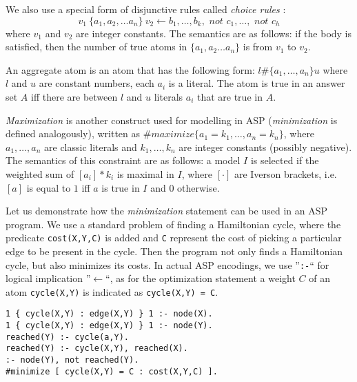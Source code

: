 We also use a special form of disjunctive rules called \textit{choice rules} \parencite{ASPbook}:
\begin{equation*}
  v_1~\{ a_1, a_2, \dots a_n \}~v_2 \leftarrow b_1, \dots, b_k, \textit{ not }c_1,\dots,\textit{ not }c_h
\end{equation*}
where $v_1$ and $v_2$ are integer constants. The semantics are as follows: if the body is satisfied, then the number of true atoms in $\{ a_1, a_2 \dots a_n \}$ is from $v_1$ to $v_2$.

An aggregate atom is an atom that has the following form: $l \# \{ a_1, \dots ,a_n \} u$
where $l$ and $u$ are constant numbers, each $a_i$ is a literal. \pubrev The atom is true in an answer set $A$ iff there are between $l$ and $u$ literals $a_i$ that are true in $A$. 

\textit{Maximization} is another construct used for modelling in ASP \parencite{ASPbook, leone} (\textit{minimization} is defined analogously), written as $\#\textit{maximize}\{ a_1=k_1, \dots, a_n=k_n \}$, 
where $a_1, \dots, a_n$ are classic literals and $k_1, \dots, k_n$ are integer constants (possibly negative). The semantics of this constraint are as follows: a model $I$ is selected if the weighted sum of $[a_i]*k_i$ is maximal in $I$, where $[\cdot]$ are Iverson brackets, i.e. $[a]$ is equal to $1$ iff $a$ is true in $I$ and $0$ otherwise. \pubrevend

\begin{example}
    \pubrev
    Let us demonstrate how the \textit{minimization} statement can be used in an ASP program. We use a standard problem of finding a Hamiltonian cycle, where the predicate \texttt{cost(X,Y,C)} is added and \texttt{C} represent the cost of picking a particular edge to be present in the cycle. Then the program not only finds a Hamiltonian cycle, but also minimizes its costs. In actual ASP encodings, we use ''\texttt{:-}`` for logical implication ''$\leftarrow$``, as for the optimization statement a weight $C$ of an atom \texttt{cycle(X,Y)} is indicated as \texttt{cycle(X,Y) = C}.
\begin{minipage}{\linewidth}
    \begin{lstlisting}[caption=ASP encoding of the Hamiltonian cycle problem (due to \textcite{ASPbook}), label=lst:example_asp_coloring,basicstyle=\ttfamily]
1 { cycle(X,Y) : edge(X,Y) } 1 :- node(X). 
1 { cycle(X,Y) : edge(X,Y) } 1 :- node(Y).
reached(Y) :- cycle(a,Y).
reached(Y) :- cycle(X,Y), reached(X).
:- node(Y), not reached(Y).
#minimize [ cycle(X,Y) = C : cost(X,Y,C) ].
\end{lstlisting}
\end{minipage}
\pubrevend
\end{example}

